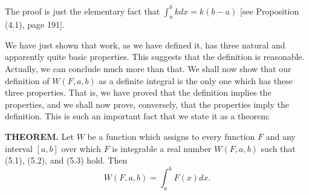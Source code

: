 The proof is just the elementary fact that $\int_a^b kdx = k(b - a)$ [see Proposition (4.1), page 191].

We have just shown that work, as we have defined it, has three natural and apparently quite basic properties. This suggests that the definition is reasonable. Actually, we can conclude much more than that. We shall now show that our definition of $W(F, a, b)$ as a definite integral is the only one which has these three properties. That is, we have proved that the definition implies the properties, and we shall now prove, conversely, that the properties imply the definition.  This is such an important fact that we state it as a theorem:

\begin{theorem} %
\textbf{THEOREM.} 
Let $W$ be a function which assigns to every function $F$ and any interval $[a, b]$ over which $F$ is integrable a real number $W(F, a, b)$ such that (5.1), (5.2), and (5.3) hold. Then
$$
W(F, a, b) = \int_a^b F(x) dx.
$$
\end{theorem}
 
